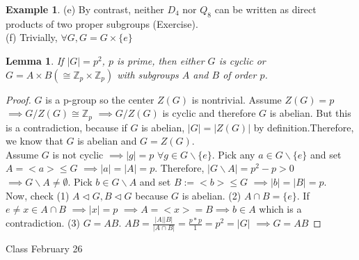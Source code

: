 \documentclass[11pt]{article}
\newtheorem{lem}[thm]{Lemma}
\theoremstyle{definition}
\newtheorem{example}[thm]{Example}
\numberwithin{equation}{section}
\newcommand{\Z}{\mathbb{Z}}
\begin{document}
\begin{enumerate}
\begin{example}
(e) By contrast, neither $D_4$ nor $Q_8$ can be written as direct products of two proper subgroups (Exercise).\\
(f) Trivially, $\forall G, G = G \times \{e\}$
\end{example}
\begin{lem}
If $|G| = p^{2}$, $p$ is prime, then either $G$ is cyclic or $G = A \times B (\cong \Z_p \times \Z_p)$ with subgroups $A$ and $B$ of order $p$.
\end{lem}
\begin{proof}
$G$ is a p-group so the center $Z(G)$ is nontrivial. Assume $Z(G) = p$ $\implies G/Z(G) \cong \Z_p$ $\implies G/Z(G)$ is cyclic and therefore $G$ is abelian. But this is a contradiction, because if $G$ is abelian, $|G| = |Z(G)|$ by definition.Therefore, we know that $G$ is abelian and $G = Z(G)$.\\
Assume $G$ is not cyclic $\implies |g| = p$ $\forall g \in G \smallsetminus \{e\}$. Pick any $a \in G \smallsetminus \{e\}$ and set $A = <a> \leq G$ $\implies |a| = |A| = p$. Therefore, $|G \smallsetminus A| = p^{2} - p > 0$ $\implies G \smallsetminus A \neq \emptyset$. Pick $b \in G \smallsetminus A$ and set $B := <b> \leq G$ $\implies |b| = |B| = p$.\\
Now, check (1) $A \vartriangleleft G, B \vartriangleleft G$ because $G$ is abelian. (2) $A \cap B = \{e\}$. If $e \neq x \in A \cap B$ $\implies |x| = p$ $\implies A = <x> = B \implies b \in A$ which is a contradiction. (3) $G = AB$. $AB = \frac{|A||B|}{|A \cap B|} = \frac{p*p}{1} = p^{2} = |G|$ $\implies G = AB$
\end{proof}
\end{enumerate}

\begin{center}
{\sf\LARGE Class February 26}
\end{center}
\end{document}
